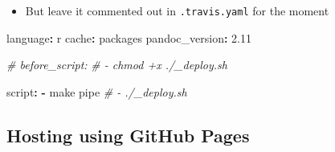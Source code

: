\documentclass[
]{article}
\newenvironment{Shaded}{\begin{snugshade}}{\end{snugshade}}
\newcommand{\AttributeTok}[1]{\textcolor[rgb]{0.77,0.63,0.00}{#1}}
\newcommand{\CommentTok}[1]{\textcolor[rgb]{0.56,0.35,0.01}{\textit{#1}}}
\newcommand{\FloatTok}[1]{\textcolor[rgb]{0.00,0.00,0.81}{#1}}
\newcommand{\FunctionTok}[1]{\textcolor[rgb]{0.00,0.00,0.00}{#1}}
\newcommand{\KeywordTok}[1]{\textcolor[rgb]{0.13,0.29,0.53}{\textbf{#1}}}
\providecommand{\tightlist}{%
  \setlength{\itemsep}{0pt}\setlength{\parskip}{0pt}}
\begin{document}
\begin{itemize}
\begin{itemize}
    \begin{itemize}
    \tightlist
    \item
      But leave it commented out in \texttt{.travis.yaml} for the moment
    \end{itemize}
  \end{itemize}
\end{itemize}

\begin{Shaded}
\begin{Highlighting}[]
\FunctionTok{language}\KeywordTok{:}\AttributeTok{ r}
\FunctionTok{cache}\KeywordTok{:}\AttributeTok{ packages}
\FunctionTok{pandoc\_version}\KeywordTok{:}\AttributeTok{ }\FloatTok{2.11}

\CommentTok{\# before\_script:}
\CommentTok{\#   {-} chmod +x ./\_deploy.sh}

\FunctionTok{script}\KeywordTok{:}
\AttributeTok{  }\KeywordTok{{-}}\AttributeTok{ make pipe}
\CommentTok{  \# {-} ./\_deploy.sh}
\end{Highlighting}
\end{Shaded}

\hypertarget{hosting-using-github-pages}{%
\subsection{Hosting using GitHub Pages}\label{hosting-using-github-pages}}
\end{document}
